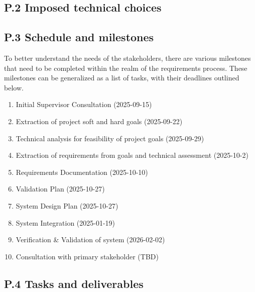\documentclass[12pt]{article}
\theoremstyle{definition}
\begin{document}
\subsection{P.2 Imposed technical choices}

\subsection{P.3 Schedule and milestones} \label{item: p3}   

To better understand the needs of the stakeholders, there are various milestones
 that need to be completed within the realm of the requirements process.
These milestones can be generalized as a list of tasks, with their deadlines 
outlined below.

\begin{enumerate}
  \item Initial Supervisor Consultation (2025-09-15) \label{item: p3-1}
  \item Extraction of project soft and hard goals (2025-09-22) 
  \label{item: p3-2}
  \item Technical analysis for feasibility of project goals (2025-09-29) 
  \label{item: p3-3}
  \item Extraction of requirements from goals and technical assessment 
  (2025-10-2) \label{item: p3-4}
  \item Requirements Documentation (2025-10-10) \label{item: p3-5}
  \item Validation Plan (2025-10-27) \label{item: p3-6}
  \item System Design Plan (2025-10-27) \label{item: p3-7}
  \item System Integration (2025-01-19) \label{item: p3-8}
  \item Verification \& Validation of system (2026-02-02) \label{item: p3-9}
  \item Consultation with primary stakeholder (TBD) \label{item: p3-10}
\end{enumerate}

\subsection{P.4 Tasks and deliverables}
\end{document}
